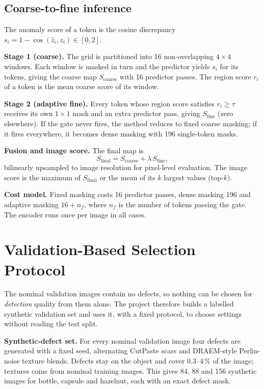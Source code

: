 \documentclass[12pt,a4paper,oneside]{report}
\begin{document}
\subsection{Coarse-to-fine inference}

The anomaly score of a token is the cosine discrepancy
$s_i = 1-\cos(\hat z_i, z_i)\in[0,2]$.

\textbf{Stage 1 (coarse).} The grid is partitioned into 16 non-overlapping
$4\times4$ windows. Each window is masked in turn and the predictor yields
$s_i$ for its tokens, giving the coarse map $S_{\mathrm{coarse}}$ with 16
predictor passes. The region score $r_i$ of a token is the mean coarse score
of its window.

\textbf{Stage 2 (adaptive fine).} Every token whose region score satisfies
$r_i\ge\tau$ receives its own $1\times1$ mask and an extra predictor pass,
giving $S_{\mathrm{fine}}$ (zero elsewhere). If the gate never fires, the
method reduces to fixed coarse masking; if it fires everywhere, it becomes
dense masking with 196 single-token masks.

\textbf{Fusion and image score.} The final map is
\begin{equation}
S_{\mathrm{final}}=S_{\mathrm{coarse}}+\lambda\,S_{\mathrm{fine}},
\end{equation}
bilinearly upsampled to image resolution for pixel-level evaluation. The
image score is the maximum of $S_{\mathrm{final}}$ or the mean of its $k$
largest values (top-$k$).

\textbf{Cost model.} Fixed masking costs 16 predictor passes, dense masking
196 and adaptive masking $16+n_f$, where $n_f$ is the number of tokens
passing the gate. The encoder runs once per image in all cases.

\section{Validation-Based Selection Protocol}

The nominal validation images contain no defects, so nothing can be chosen
for \emph{detection} quality from them alone. The project therefore builds a
labelled synthetic validation set and uses it, with a fixed protocol, to
choose settings without reading the test split.

\textbf{Synthetic-defect set.} For every nominal validation image four
defects are generated with a fixed seed, alternating CutPaste scars and
DRAEM-style Perlin-noise texture blends. Defects stay on the object and
cover 0.3--4\,\% of the image; textures come from nominal training images.
This gives 84, 88 and 156 synthetic images for bottle, capsule and hazelnut,
each with an exact defect mask.
\end{document}
